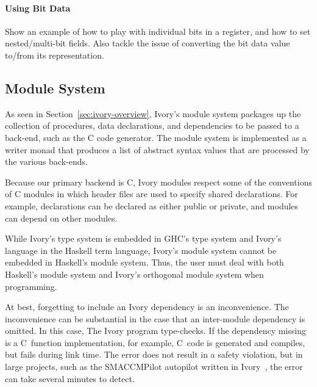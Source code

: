\begin{code}
[ivory|
  bitdata CtrlReg :: Bits 8 = ctrl_reg
    { ctrl_tx_enable  :: Bit
    , ctrl_rx_enable  :: Bit
    , ctrl_baud_rate  :: BaudRate
    } as 0b0000 # ctrl_tx_enable # ctrl_rx_enable
                # ctrl_baud_rate
|]
\end{code}

\paragraph{Using Bit Data}
Show an example of how to play with individual bits in a register, and how
to set nested/multi-bit fields. Also tackle the issue of converting the
bit data value to/from its representation.

\subsection{Module System}

As seen in Section~\ref{sec:ivory-overview}, Ivory's module system packages up
the collection of procedures, data declarations, and dependencies to be passed
to a back-end, such as the C code generator. The module system is implemented as
a writer monad that produces a list of abstract syntax values that are processed
by the various back-ends.

Because our primary backend is C, Ivory modules respect some of the conventions
of C modules in which header files are used to specify shared declarations. For
example, declarations can be declared as either public or private, and modules
can depend on other modules.

While Ivory's type system is embedded in GHC's type system and Ivory's language
in the Haskell term language, Ivory's module system cannot be embedded in
Haskell's module system. Thus, the user must deal with both Haskell's module
system and Ivory's orthogonal module system when programming.

At best, forgetting to include an Ivory dependency is an inconvenience. The
inconvenience can be substantial in the case that an inter-module dependency is
omitted. In this case, The Ivory program type-checks. If the dependency missing
is a C~function implementation, for example, C~code is generated and compiles,
but fails during link time. The error does not result in a safety violation, but
in large projects, such as the SMACCMPilot autopilot written in Ivory~\cite{},
the error can take several minutes to detect.

